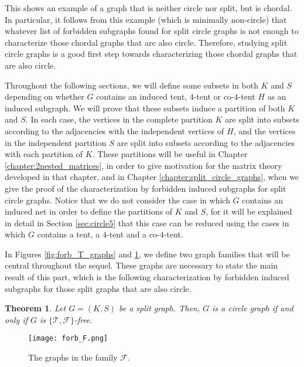 \documentclass[12pt]{book}
\theoremstyle{plain}
\newtheorem{teo}{Theorem}[chapter]
\newcounter{cases}
\theoremstyle{remark}
\begin{document}
This shows an example of a graph that is neither circle nor split, but is chordal. In particular, it follows from this example (which is minimally non-circle) that whatever list of forbidden subgraphs found for split circle graphs is not enough to characterize those chordal graphs that are also circle. Therefore, studying split circle graphs is a good first step towards characterizing those chordal graphs that are also circle.


Throughout the following sections, we will define some subsets in both $K$ and $S$ depending on whether $G$ contains an induced tent, $4$-tent or co-$4$-tent $H$ as an induced subgraph. We will prove that these subsets induce a partition of both $K$ and $S$. In each case, the vertices in the complete partition $K$ are split into subsets according to the adjacencies with the independent vertices of $H$, and the vertices in the independent partition $S$ are split into subsets according to the adjacencies with each partition of $K$.
These partitions will be useful in Chapter \ref{chapter:2nested_matrices}, in order to give motivation for the matrix theory developed in that chapter, and in Chapter \ref{chapter:split_circle_graphs}, when we give the proof of the characterization by forbidden induced subgraphs for split circle graphs.
Notice that we do not consider the case in which $G$ contains an induced net in order to define the partitions of $K$ and $S$, for it will be explained in detail in Section \ref{sec:circle5} that this case can be reduced using the cases in which $G$ contains a tent, a $4$-tent and a co-$4$-tent.

In Figures \ref{fig:forb_T_graphs} and \ref{fig:forb_F_graphs}, we define two graph families that will be central throughout the sequel. These graphs are necessary to state the main result of this part, which is the following characterization by forbidden induced subgraphs for those split graphs that are also circle.

\begin{teo}
Let $G=(K,S)$ be a split graph. Then, $G$ is a circle graph if and only if $G$ is $\{ \mathcal{T}, \mathcal{F}\}$-free. %
\end{teo}

\begin{figure}[h]
\centering
\texttt{[image: forb\_F.png]} 
\caption{The graphs in the family $\mathcal{F}$.} \label{fig:forb_F_graphs}
\end{figure}
\end{document}
